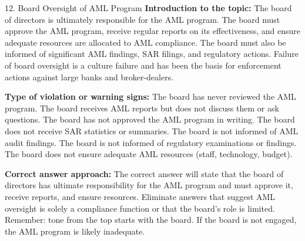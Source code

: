 \documentclass[11pt,a4paper]{beamer}
\begin{document}
\begin{frame}{12. Board Oversight of AML Program}
\tiny
\noindent\textbf{Introduction to the topic:} The board of directors is ultimately responsible for the AML program. The board must approve the AML program, receive regular reports on its effectiveness, and ensure adequate resources are allocated to AML compliance. The board must also be informed of significant AML findings, SAR filings, and regulatory actions. Failure of board oversight is a culture failure and has been the basis for enforcement actions against large banks and broker-dealers.

\vspace{0.1cm}
\noindent\textbf{Type of violation or warning signs:} The board has never reviewed the AML program. The board receives AML reports but does not discuss them or ask questions. The board has not approved the AML program in writing. The board does not receive SAR statistics or summaries. The board is not informed of AML audit findings. The board is not informed of regulatory examinations or findings. The board does not ensure adequate AML resources (staff, technology, budget).

\vspace{0.1cm}
\noindent\textbf{Correct answer approach:} The correct answer will state that the board of directors has ultimate responsibility for the AML program and must approve it, receive reports, and ensure resources. Eliminate answers that suggest AML oversight is solely a compliance function or that the board's role is limited. Remember: tone from the top starts with the board. If the board is not engaged, the AML program is likely inadequate.
\end{frame}
\end{document}
